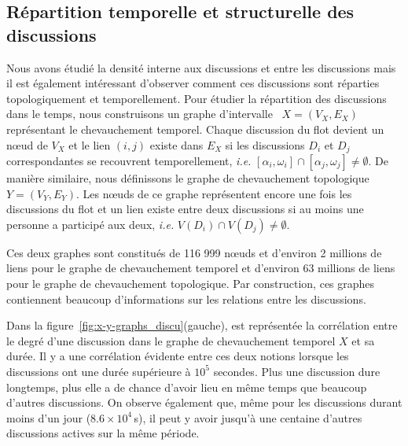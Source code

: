 \subsection{Répartition temporelle et structurelle des discussions}

Nous avons étudié la densité interne aux discussions et entre les discussions mais il est également intéressant d'observer comment ces discussions sont réparties topologiquement et temporellement.
Pour étudier la répartition des discussions dans le temps, nous construisons un graphe d'intervalle~\cite{Lekkeikerker} $X=(V_X,E_X)$ représentant le chevauchement temporel.
Chaque discussion du flot devient un n\oe{}ud de $V_X$ et le lien $(i,j)$ existe dans $E_X$ si les discussions $D_i$ et $D_j$ correspondantes se recouvrent temporellement, \emph{i.e.} $[\alpha_i, \omega_i] \cap [\alpha_j, \omega_j] \neq \emptyset$.
De manière similaire, nous définissons le graphe de chevauchement topologique $Y=(V_Y,E_Y)$.
Les n\oe{}uds de ce graphe représentent encore une fois les discussions du flot et un lien existe entre deux discussions si au moins une personne a participé aux deux, \emph{i.e.} $V(D_i) \cap V(D_j) \neq \emptyset$.

Ces deux graphes sont constitués de 116 999 n\oe{}uds et d'environ 2 millions de liens pour le graphe de chevauchement temporel et d'environ 63 millions de liens pour le graphe de chevauchement topologique.
Par construction, ces graphes contiennent beaucoup d'informations sur les relations entre les discussions.


Dans la figure~\ref{fig:x-y-graphs_discu}(gauche), est représentée la corrélation entre le degré d'une discussion dans le graphe de chevauchement temporel $X$ et sa durée.
Il y a une corrélation évidente entre ces deux notions lorsque les discussions ont une durée supérieure à $10^5$ secondes.
Plus une discussion dure longtemps, plus elle a de chance d'avoir lieu en même temps que beaucoup d'autres discussions.
On observe également que, même pour les discussions durant moins d'un jour ($8.6 \times 10^4$\,s), il peut y avoir jusqu'à une centaine d'autres discussions actives sur la même période.

